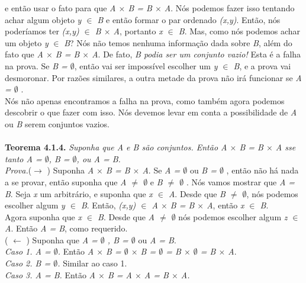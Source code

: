    e então usar o fato para que \textit{A $\times$ B = B $\times$ A}. Nós podemos fazer isso tentando achar algum objeto \textit{y $\in$ B} e então formar o par ordenado \textit{(x,y)}. 	Então, nós poderíamos ter \textit{(x,y) $\in$ B $\times$  A}, portanto \textit{x $\in$ B}. Mas, como nós podemos achar um objeto \textit{y} $\in$ \textit{B}? Nós não temos nenhuma informação dada sobre \textit{B}, além do fato que \textit{A $\times$ B = B $\times$ A}. De fato, \textit{B podia ser um conjunto vazio!} Esta é a falha na prova. Se \textit{B = $\emptyset$}, então vai ser impossível escolher um \textit{y $\in$ B}, e a prova vai desmoronar. Por razões similares, a outra metade da prova não irá funcionar se \textit{A = $\emptyset$ }.
   \\ \indent Nós não apenas encontramos a falha na prova, como também agora podemos descobrir o que fazer com isso. Nós devemos levar em conta a possibilidade de \textit{A} ou \textit{B} serem conjuntos vazios.
 \\
 \\
 \textbf{Teorema 4.1.4.} \textit{Suponha que A e B são conjuntos. Então A $\times$ B = B $\times$ A sse tanto A = $\emptyset$, B = $\emptyset$, ou A = B.}
 \\
 \textit{Prova.}($\rightarrow$ ) Suponha \textit{A $\times$ B = B $\times$ A}. Se \textit{A = $\emptyset$ } ou \textit{B = $\emptyset$ },  então não há nada a se provar, então suponha que \textit{A $\neq$  $\emptyset$} e \textit{B $\neq$  $\emptyset$ }. Nós vamos mostrar que \textit{A = B}. Seja \textit{x} um arbitrário, e suponha que \textit{x $\in$ A}. Desde que \textit{B $\neq$  $\emptyset$}, nós podemos escolher algum \textit{y $\in$ B}. Então, \textit{(x,y) $\in$ A $\times$ B = B $\times$ A}, então \textit{x $\in$ B}. 
 \\ 
 \indent Agora suponha que \textit{x $\in$ B}. Desde que \textit{A $\neq$  $\emptyset$ } nós podemos escolher algum \textit{z $\in$ A}. Então \textit{A = B}, como requerido.
 \\
\indent ( $\leftarrow$ ) Suponha que \textit{A = $\emptyset$ , B = $\emptyset$} ou \textit{A = B}.
 \\ \textit{Caso 1. A = $\emptyset$.} Então \textit{A $\times$ B = $\emptyset$ $\times$ B = $\emptyset$  = B $\times$ $\emptyset$  = B $\times$ A}.
 \\ \textit{Caso 2. B = $\emptyset$.} Similar ao caso 1.
 \\ \textit{Caso 3. A = B.} Então \textit{A $\times$ B = A $\times$ A = B $\times$ A.}
 \\
